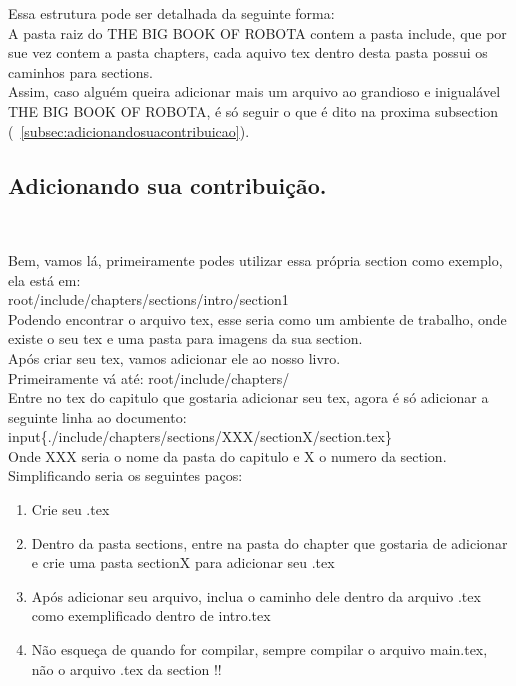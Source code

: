 Essa estrutura pode ser detalhada da seguinte forma:\\										%
A pasta raiz do THE BIG BOOK OF ROBOTA contem a pasta include, que por sue vez contem a pasta chapters,
cada aquivo tex dentro desta pasta possui os caminhos para sections.\\

Assim, caso algu\'em queira adicionar mais um arquivo ao grandioso e inigualável THE BIG BOOK OF ROBOTA, 
\'e s\'o seguir o que \'e dito na proxima subsection (~\ref{subsec:adicionandosuacontribuicao}).		%

\subsection{Adicionando sua contribuição.} ~\label{subsec:adicionandosuacontribuicao}			%

Bem, vamos l\'a, primeiramente podes utilizar essa pr\'opria section como exemplo, ela est\'a em:\\
root/include/chapters/sections/intro/section1\\													
Podendo encontrar o arquivo tex, esse seria como um ambiente de trabalho, onde existe o seu tex
e uma pasta para imagens da sua section. \\
Após criar seu tex, vamos adicionar ele ao nosso livro.\\
Primeiramente vá até: 
root/include/chapters/\\
Entre no tex do capitulo que gostaria adicionar seu tex, agora é só adicionar a seguinte linha ao documento:\\
input\{./include/chapters/sections/XXX/sectionX/section.tex\}\\
Onde XXX seria o nome da pasta do capitulo e X o numero da section.\\
Simplificando seria os seguintes paços:\\

\begin{enumerate}
\item Crie seu .tex 
\item Dentro da pasta sections, entre na pasta do chapter que gostaria de adicionar e crie uma pasta sectionX para adicionar seu .tex 
\item Ap\'os adicionar seu arquivo, inclua o caminho dele dentro da arquivo .tex como exemplificado dentro de intro.tex
\item N\~ao esqueça de quando for compilar, sempre compilar o arquivo main.tex, não o arquivo .tex da section !!
\end{enumerate}

\author{Patrick J.P}		%


